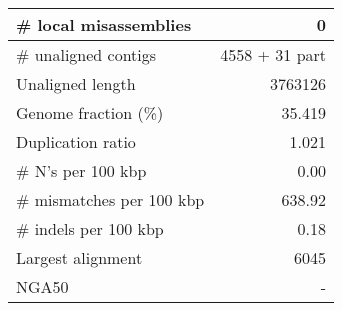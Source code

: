 \documentclass[12pt,a4paper]{article}
\begin{document}
\begin{table}[ht]
\begin{center}
\begin{tabular}{|l*{1}{|r}|}
\# local misassemblies & 0 \\ \hline
\# unaligned contigs & 4558 + 31 part \\ \hline
Unaligned length & 3763126 \\ \hline
Genome fraction (\%) & 35.419 \\ \hline
Duplication ratio & 1.021 \\ \hline
\# N's per 100 kbp & 0.00 \\ \hline
\# mismatches per 100 kbp & 638.92 \\ \hline
\# indels per 100 kbp & 0.18 \\ \hline
Largest alignment & 6045 \\ \hline
NGA50 & - \\ \hline
\end{tabular}
\end{center}
\end{table}
\end{document}
